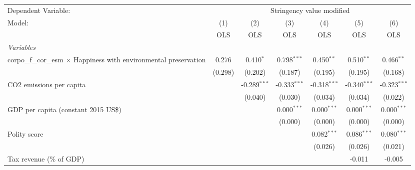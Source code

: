 
\begingroup
\centering
\begin{tabular}{lcccccc}
   \toprule
   Dependent Variable: & \multicolumn{6}{c}{Stringency value modified}\\
   Model:                                                                    & (1)     & (2)            & (3)            & (4)            & (5)            & (6)\\  
                                                                             &  OLS    & OLS            & OLS            & OLS            & OLS            & OLS\\  
   \midrule
   \emph{Variables}\\
   corpo\_f\_cor\_esm $\times$ Happiness with environmental preservation     & 0.276   & 0.410$^{*}$    & 0.798$^{***}$  & 0.450$^{**}$   & 0.510$^{**}$   & 0.466$^{**}$\\   
                                                                             & (0.298) & (0.202)        & (0.187)        & (0.195)        & (0.195)        & (0.168)\\   
   CO2 emissions per capita                                                  &         & -0.289$^{***}$ & -0.333$^{***}$ & -0.318$^{***}$ & -0.340$^{***}$ & -0.323$^{***}$\\   
                                                                             &         & (0.040)        & (0.030)        & (0.034)        & (0.034)        & (0.022)\\   
   GDP per capita (constant 2015 US\$)                                       &         &                & 0.000$^{***}$  & 0.000$^{***}$  & 0.000$^{***}$  & 0.000$^{***}$\\   
                                                                             &         &                & (0.000)        & (0.000)        & (0.000)        & (0.000)\\   
   Polity score                                                              &         &                &                & 0.082$^{***}$  & 0.086$^{***}$  & 0.080$^{***}$\\   
                                                                             &         &                &                & (0.026)        & (0.026)        & (0.021)\\   
   Tax revenue (\% of GDP)                                                   &         &                &                &                & -0.011         & -0.005\\   

\end{tabular}
